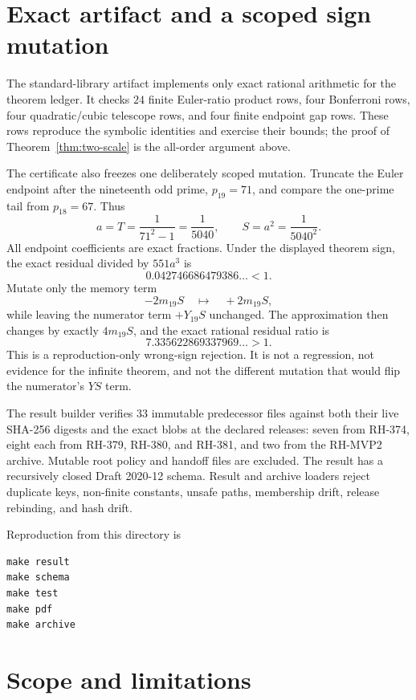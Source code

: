 \documentclass[11pt]{article}
\theoremstyle{definition}
\theoremstyle{remark}
\begin{document}
\section{Exact artifact and a scoped sign mutation}

The standard-library artifact implements only exact rational arithmetic for
the theorem ledger.  It checks $24$ finite Euler-ratio product rows, four
Bonferroni rows, four quadratic/cubic telescope rows, and four finite
endpoint gap rows.  These rows reproduce the symbolic identities and
exercise their bounds; the proof of Theorem~\ref{thm:two-scale} is the
all-order argument above.

The certificate also freezes one deliberately scoped mutation.  Truncate
the Euler endpoint after the nineteenth odd prime, $p_{19}=71$, and compare
the one-prime tail from $p_{18}=67$.  Thus
\[
 a=T=\frac1{71^2-1}=\frac1{5040},\qquad
 S=a^2=\frac1{5040^2}.
\]
All endpoint coefficients are exact fractions.  Under the displayed theorem
sign, the exact residual
divided by $551a^3$ is
\[
 0.042746686479386\ldots<1.
\]
Mutate only the memory term
\[
 -2m_{19}S\quad\longmapsto\quad+2m_{19}S,
\]
while leaving the numerator term $+Y_{19}S$ unchanged.  The approximation
then changes by exactly $4m_{19}S$, and the exact rational residual ratio is
\[
 7.335622869337969\ldots>1.
\]
This is a reproduction-only wrong-sign rejection.  It is not a regression,
not evidence for the infinite theorem, and not the different mutation that
would flip the numerator's $Y S$ term.

The result builder verifies $33$ immutable predecessor files against both
their live SHA-256 digests and the exact blobs at the declared releases:
seven from RH-374, eight each from RH-379, RH-380, and RH-381, and two from
the RH-MVP2 archive.  Mutable root policy and handoff files are excluded.
The result has a recursively closed Draft 2020-12 schema.  Result and
archive loaders reject duplicate keys, non-finite constants, unsafe paths,
membership drift, release rebinding, and hash drift.

Reproduction from this directory is
\begin{verbatim}
make result
make schema
make test
make pdf
make archive
\end{verbatim}

\section{Scope and limitations}
\end{document}
